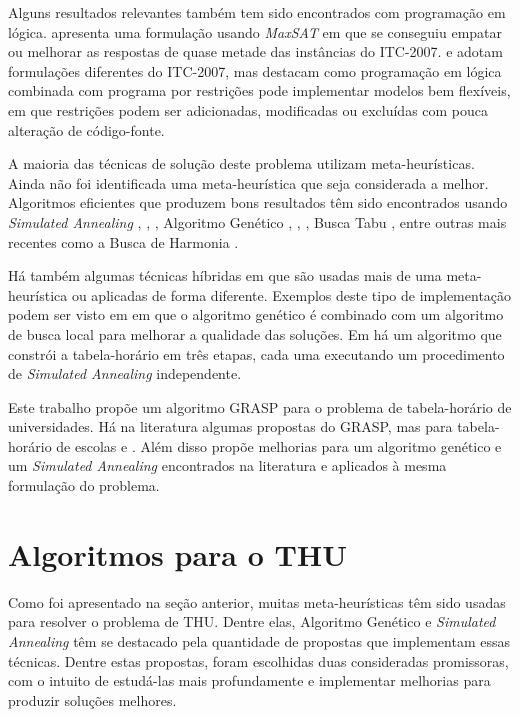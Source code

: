 \documentclass[11pt]{article}
\begin{document}
Alguns resultados relevantes também tem sido encontrados com programação em lógica. \cite{springerlink:10.1007/s10479-012-1081-x} apresenta uma formulação usando \textit{MaxSAT} em que se conseguiu empatar ou melhorar as respostas de quase metade das instâncias do ITC-2007. \cite{Gueret95buildinguniversity} e \cite{Goltz99universitytimetabling} adotam formulações diferentes do ITC-2007, mas destacam como programação em lógica combinada com programa por restrições pode implementar modelos bem flexíveis, em que restrições podem ser adicionadas, modificadas ou excluídas com pouca alteração de código-fonte.

A maioria das técnicas de solução deste problema utilizam meta-heurísticas. Ainda não foi identificada uma meta-heurística que seja considerada a melhor.  Algoritmos eficientes que produzem bons resultados têm sido encontrados usando \textit{Simulated Annealing} \cite{3-phaseSA}, \cite{sa_hyper_heuristica}, \cite{Elmohamed98acomparison}, Algoritmo Genético \cite{Erben95agenetic}, \cite{suyanto}, \cite{Kanoh:2008:KGA:1460198.1460201}, Busca Tabu \cite{elloumi2008}, entre outras mais recentes como a Busca de Harmonia \cite{albetar_harmony}.

Há também algumas técnicas híbridas em que são usadas mais de uma meta-heurística ou aplicadas de forma diferente. Exemplos deste tipo de implementação podem ser visto em \cite{massoodian2008} em que o algoritmo genético é combinado com um algoritmo de busca local para melhorar a qualidade das soluções. Em \cite{3-phaseSA} há um algoritmo que constrói a tabela-horário em três etapas, cada uma executando um procedimento de \textit{Simulated Annealing} independente.

Este trabalho propõe um algoritmo GRASP para o problema de tabela-horário de universidades. Há na literatura algumas propostas do GRASP, mas para tabela-horário de escolas \cite{Souza:2004} e \cite{Vieira_agrasp}. Além disso propõe melhorias para um algoritmo genético e um \textit{Simulated Annealing} encontrados na literatura e aplicados à mesma formulação do problema.


\section{Algoritmos para o THU}
\label{sec:algoritmos}

Como foi apresentado na seção anterior, muitas meta-heurísticas têm sido usadas para resolver o problema de THU. Dentre elas, Algoritmo Genético e \textit{Simulated Annealing} têm se destacado pela quantidade de propostas que implementam essas técnicas. Dentre estas propostas, foram escolhidas duas consideradas promissoras, com o intuito de estudá-las mais profundamente e implementar melhorias para produzir soluções melhores.
\end{document}
